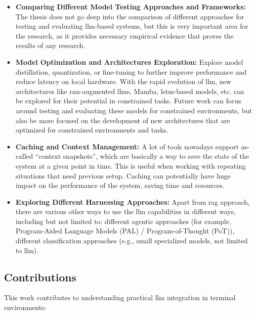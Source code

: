 \begin{itemize}
  \item \textbf{Comparing Different Model Testing Approaches and Frameworks:}
    The thesis does not go deep into the comparison of different approaches for
    testing and evaluating \gls{llm}-based systems, but this is very
    important area for the research, as it provides necessary empirical
    evidence that proves the results of any research.
  \item \textbf{Model Optimization and Architectures Exploration:} Explore model
    distillation, quantization, or fine-tuning to further improve performance
    and reduce latency on local hardware. With the rapid evolution of
    \gls{llm}, new architectures like \gls{rnn}-augmented \glspl{llm},
    Mamba, \gls{lstm}-based models, etc. can be explored for their potential
    in constrained tasks. Future work can focus around testing and
    evaluating these models for constrained environments, but also be more
    focused on the development of new architectures that are optimized for
    constrained environments and tasks.
  \item \textbf{Caching and Context Management:} A lot of tools nowadays support
    as-called ``context snapshots'', which are basically a way to save the state
    of the system at a given point in time. This is useful when working with
    repeating situations that need previous setup. Caching can potentially
    have huge impact on the performance of the system, saving time and
    resources.
\item \textbf{Exploring Different Harnessing Approaches:} Apart from \gls{rag}
    approach, there are various other ways to use the \gls{llm} capabilities in
    different ways, including but not limited to: different agentic
    approaches (for example, Program-Aided Language Models (PAL) /
    Program-of-Thought (PoT)), different classification approaches (e.g.,
    small specialized models, not limited to \gls{llm}).
\end{itemize}


\subsection{Contributions}

This work contributes to understanding practical \gls{llm} integration in
terminal environments:

